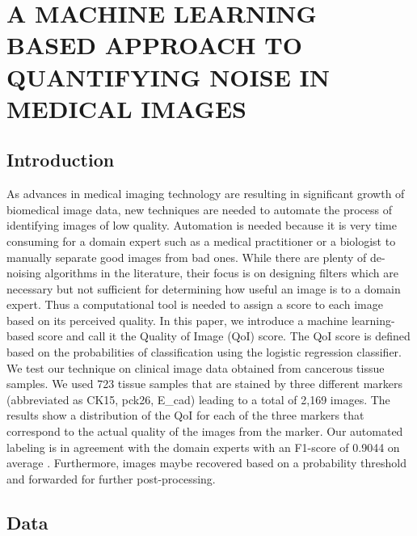 \chapter{A MACHINE LEARNING BASED APPROACH TO QUANTIFYING NOISE IN MEDICAL IMAGES}
\label{chap:SPIE1}

\let\thefootnote\relax{}

\section{Introduction}

As advances in medical imaging technology are resulting in significant growth of biomedical image data, new techniques are needed to automate the process of identifying images of low quality. Automation is needed because it is very time consuming for a domain expert such as a medical practitioner or a biologist to manually separate good images from bad ones. While there are plenty of de-noising algorithms in the literature, their focus is on designing filters which are necessary but not sufficient for determining how useful an image is to a domain expert.
Thus a computational tool is needed to assign a score to each image based on its perceived quality. In this paper, we introduce a machine learning-based score and call it the Quality of Image (QoI) score. The QoI score is defined based on the probabilities of classification using the logistic regression classifier.
We test our technique on clinical image data obtained from cancerous tissue samples. We used 723 tissue samples that are stained by three different markers (abbreviated as CK15, pck26, E\_cad) leading to a total of 2,169 images. The results show a distribution of the QoI for each of the three markers that correspond to the actual quality of the images from the marker. Our automated labeling is in agreement with the domain experts with an F1-score of 0.9044 on average . Furthermore, images maybe recovered based on a probability threshold and forwarded for further post-processing.

\section{Data}


